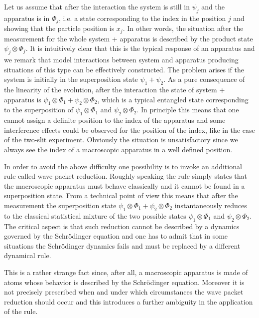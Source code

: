 \documentclass[12pt,reqno]{amsart}
\newcommand{\n}{\relax}
\numberwithin{equation}{section}
\begin{document}
\n
Let us assume that after the interaction the system is still in $\psi_j$ and the apparatus is in $\Phi_j$, i.e. a state corresponding to the index in the position $j$ and showing that the particle position is $x_j$. 
In other words, the situation after the measurement  for the whole system + apparatus is described by the product state $\psi_j \otimes \Phi_j$. It is intuitively clear that this is the  typical response of an apparatus and   we remark that model interactions between system and apparatus producing situations of this type can be effectively constructed. The problem arises if the system is initially in the superposition state $\psi_1 + \psi_2$. As a pure consequence of the linearity of the evolution, after the interaction the state of system + apparatus is $\psi_1 \otimes \Phi_1 + \psi_2 \otimes \Phi_2$, which is a typical entangled state corresponding to the superposition of $\psi_1 \otimes \Phi_1$ and  $ \psi_2 \otimes \Phi_2$. In principle this means that one cannot assign a definite position to the index of the apparatus and some interference effects could be observed for the position of the index, like in the case of the two-slit experiment.  Obviously the situation is unsatisfactory since we always see the index of a macroscopic  apparatus in a well defined position.


\n
In order to avoid the above difficulty one possibility is to invoke  an additional rule called wave packet reduction. Roughly speaking the rule simply states that the macroscopic apparatus must behave classically and it cannot be found in a superposition state. From a  technical point of view this means that after the measurement the  superposition state $\psi_1 \otimes \Phi_1 + \psi_2 \otimes \Phi_2$ instantaneously reduces to   the classical statistical mixture of the two possible states $\psi_1 \otimes \Phi_1 $ and $ \psi_2 \otimes \Phi_2$. The critical aspect is that such reduction cannot be described by a dynamics governed by the Schr\"{o}dinger equation and  one  has to admit that in some situations the Schr\"{o}dinger dynamics fails and must be replaced by a different dynamical rule. 

\n
This is a rather strange fact  since, after all,  a macroscopic apparatus is made of atoms whose behavior is described  by the Schr\"{o}dinger equation. Moreover it is not precisely prescribed     when and under which circumstances  the wave packet reduction should occur and this introduces  a further ambiguity in the application of the rule.
\end{document}
